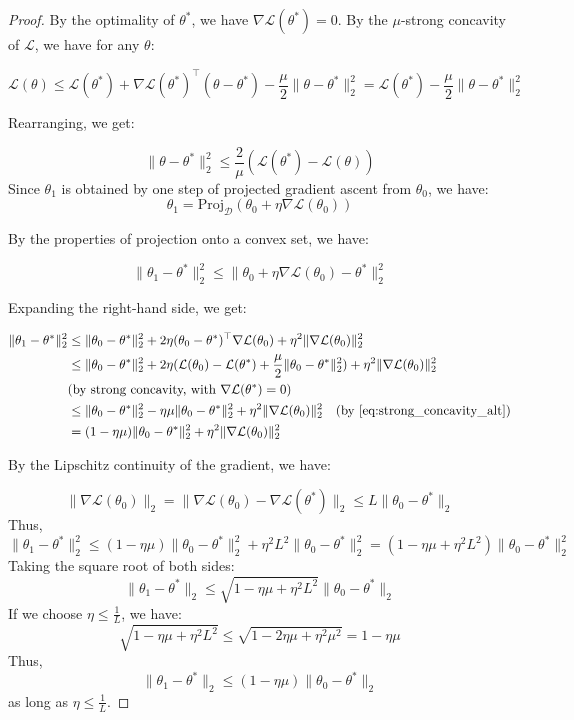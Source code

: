 \begin{proof}
By the optimality of $\theta^*$, we have $\nabla \mathcal{L}(\theta^*) = 0$.
By the $\mu$-strong concavity of $\mathcal{L}$, we have for any $\theta$:

$$
\mathcal{L}(\theta) \leq \mathcal{L}(\theta^*) + \nabla \mathcal{L}(\theta^*)^\top (\theta - \theta^*) - \frac{\mu}{2} \| \theta - \theta^* \|_2^2 = \mathcal{L}(\theta^*) - \frac{\mu}{2} \| \theta - \theta^* \|_2^2
$$

Rearranging, we get:

\begin{equation} \label{eq:strong_concavity_alt}
\| \theta - \theta^* \|_2^2 \leq \frac{2}{\mu} (\mathcal{L}(\theta^*) - \mathcal{L}(\theta))
\end{equation}
Since $\theta_1$ is obtained by one step of projected gradient ascent from $\theta_0$, we have:
$$
\theta_1 = \text{Proj}_{\mathcal{D}} (\theta_0 + \eta \nabla \mathcal{L}(\theta_0))
$$

By the properties of projection onto a convex set, we have:

$$
\| \theta_1 - \theta^* \|_2^2 \leq \| \theta_0 + \eta \nabla \mathcal{L}(\theta_0) - \theta^* \|_2^2
$$

Expanding the right-hand side, we get:

\begin{align*}
\| \theta_1 - \theta^* \|_2^2 &\leq \| \theta_0 - \theta^* \|_2^2 + 2 \eta (\theta_0 - \theta^*)^\top \nabla \mathcal{L}(\theta_0) + \eta^2 \| \nabla \mathcal{L}(\theta_0) \|_2^2 \\
&\leq \| \theta_0 - \theta^* \|_2^2 + 2 \eta (\mathcal{L}(\theta_0) - \mathcal{L}(\theta^*) + \frac{\mu}{2} \| \theta_0 - \theta^* \|_2^2) + \eta^2 \| \nabla \mathcal{L}(\theta_0) \|_2^2 \\
&\text{(by strong concavity, with } \nabla \mathcal{L}(\theta^*) = 0 \text{)}\\
&\leq \| \theta_0 - \theta^* \|_2^2 - \eta \mu \| \theta_0 - \theta^* \|_2^2 + \eta^2 \| \nabla \mathcal{L}(\theta_0) \|_2^2 \quad \text{(by \eqref{eq:strong_concavity_alt})} \\
&= (1 - \eta \mu) \| \theta_0 - \theta^* \|_2^2 + \eta^2 \| \nabla \mathcal{L}(\theta_0) \|_2^2
\end{align*}

By the Lipschitz continuity of the gradient, we have:

$$
\| \nabla \mathcal{L}(\theta_0) \|_2 = \| \nabla \mathcal{L}(\theta_0) - \nabla \mathcal{L}(\theta^*) \|_2 \leq L \| \theta_0 - \theta^* \|_2
$$
Thus,
$$
\| \theta_1 - \theta^* \|_2^2 \leq (1 - \eta \mu) \| \theta_0 - \theta^* \|_2^2 + \eta^2 L^2 \| \theta_0 - \theta^* \|_2^2 = (1 - \eta \mu + \eta^2 L^2) \| \theta_0 - \theta^* \|_2^2
$$
Taking the square root of both sides:
$$
\| \theta_1 - \theta^* \|_2 \leq \sqrt{1 - \eta \mu + \eta^2 L^2} \| \theta_0 - \theta^* \|_2
$$
If we choose $\eta \leq \frac{1}{L}$, we have:
$$
\sqrt{1 - \eta \mu + \eta^2 L^2} \leq \sqrt{1-2\eta \mu+\eta^2\mu^2} = 1 - \eta \mu
$$
Thus,
$$
\| \theta_1 - \theta^* \|_2 \leq (1 - \eta \mu) \| \theta_0 - \theta^* \|_2
$$
as long as $\eta \leq \frac{1}{L}$.
\end{proof}

